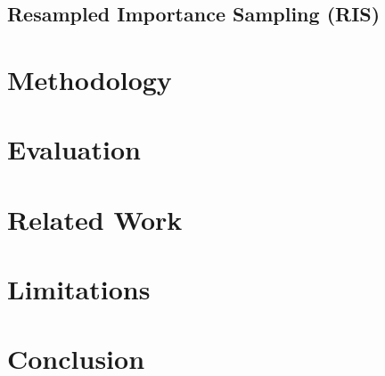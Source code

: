 \documentclass{article}
\begin{document}





%

\subsection{Resampled Importance Sampling (RIS)}

\section{Methodology}
\section{Evaluation}
\section{Related Work}
\section{Limitations}
\section{Conclusion}
\end{document}
